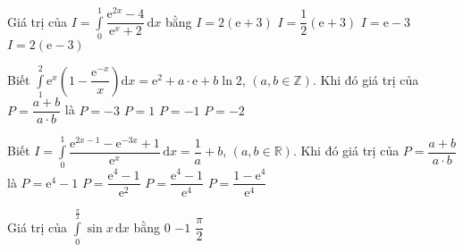 \begin{ex}%
	Giá trị của $ I=\displaystyle\int\limits_0^1\dfrac{\mathrm{e}^{2x}-4}{\mathrm{e}^x+2}\mathrm{\,d}x$ bằng
	\choice
	{$ I=2\left(\mathrm{e}+3\right)$}
	{$ I=\dfrac{1}{2}\left(\mathrm{e}+3\right)$}
	{\True $ I=\mathrm{e}-3$}
	{$ I=2\left(\mathrm{e}-3\right)$}
\end{ex}
%
\begin{ex}%
	Biết $\displaystyle\int\limits_1^2\mathrm{e}^x\left(1-\dfrac{\mathrm{e}^{-x}}{x}\right)\mathrm{d}x=\mathrm{e}^2+a\cdot \mathrm{e}+b\ln 2$, $\left(a,b\in\mathbb{Z}\right)$. Khi đó giá trị của $ P=\dfrac{a+b}{a\cdot b}$ là
	\choice
	{$ P=-3$}
	{$ P=1$}
	{$ P=-1$}
	{\True $ P=-2$}
\end{ex}

\begin{ex}%
	Biết $ I=\displaystyle\int\limits_0^1\dfrac{\mathrm{e}^{2x-1}-\mathrm{e}^{-3x}+1}{\mathrm{e}^x}\mathrm{\,d}x=\dfrac{1}{a}+b$, $\left(a,b\in\mathbb{R}\right)$. Khi đó giá trị của $ P=\dfrac{a+b}{a\cdot b}$ là
	\choice
	{$ P=\mathrm{e}^4-1$}
	{$ P=\dfrac{\mathrm{e}^4-1}{\mathrm{e}^2}$}
	{$ P=\dfrac{\mathrm{e}^4-1}{\mathrm{e}^4}$}
	{\True $ P=\dfrac{1-\mathrm{e}^4}{\mathrm{e}^4}$}
\end{ex}
%
\begin{ex}%
	Giá trị của $\displaystyle\int\limits_0^{\frac{\pi}{2}}{\sin x\mathrm{\,d}x}$ bằng
	\choice
	{0}
	{}
	{$-1$}
	{$\dfrac{\pi}{2}$}
\end{ex}


